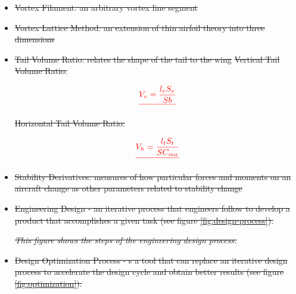 \documentclass{journal}
\providecommand{\DIFdel}[1]{{\protect\color{red}\sout{#1}}}                      %
\providecommand{\DIFdelFL}[1]{\DIFdel{#1}} %
\begin{document}
\begin{itemize}
\item%
\DIFdel{Vortex Filament: an arbitrary vortex line segment
		}%
\item%
\DIFdel{Vortex Lattice Method: an extension of thin airfoil theory into three dimensions
		}%
\item%
\DIFdel{Tail Volume Ratio: relates the shape of the tail to the wing 
		}%
\DIFdel{Vertical Tail Volume Ratio: 
		}%

\begin{displaymath}
			\DIFdel{V_v = \frac{l_vS_v}{Sb}
		}\end{displaymath}%

\DIFdel{Horizontal Tail Volume Ratio:
		}%

\begin{displaymath}
			\DIFdel{V_h = \frac{l_tS_t}{SC_{ma}}
		}\end{displaymath}%

\item%
\DIFdel{Stability Derivatives: measures of how particular forces and moments on an aircraft change as other parameters related to stability change
		}%

\item%
\DIFdel{Engineering Design - an iterative process that engineers follow to
		develop a product that accomplishes a given task (see figure \ref{fig:design-process}).
		}%

{%
\emph{\DIFdelFL{This figure shows the steps of the engineering design process.}}%
}

\item%
\DIFdel{Design Optimization Process - s a tool that can replace an iterative design
		process to accelerate the design cycle and obtain better results (see figure \ref{fig:optimization}).
		}%


\end{itemize}
\end{document}
